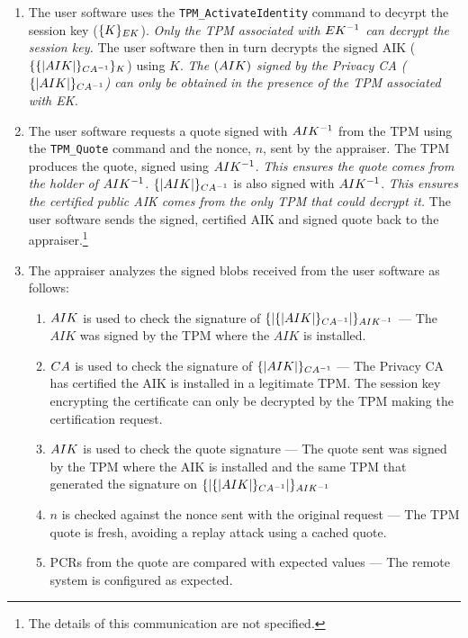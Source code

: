 \documentclass[10pt]{article}
\begin{document}
\begin{enumerate}
\item The user software uses the \verb+TPM_ActivateIdentity+ command
  to decyrpt the session key ($\{K\}_{EK}$).  \emph{Only the TPM
    associated with $EK^{-1}$ can decrypt the session key.}  The
  user software then in turn decrypts the signed AIK
  ($\{\{|AIK|\}_{CA^{-1}}\}_{K}$) using $K$.  \emph{The $(AIK)$
    signed by the Privacy CA ($\{|AIK|\}_{CA^{-1}}$) can only be
    obtained in the presence of the TPM associated with EK.}

\item The user software requests a quote signed with $AIK^{-1}$
  from the TPM using the \verb+TPM_Quote+ command and the nonce, $n$,
  sent by the appraiser.  The TPM produces the quote, signed using
  $AIK^{-1}$.  \emph{This ensures the quote comes from the holder
    of $AIK^{-1}$.}  $\{|AIK|\}_{CA^{-1}}$ is also signed
  with $AIK^{-1}$.  \emph{This ensures the certified public AIK
    comes from the only TPM that could decrypt it.}  The user software
  sends the signed, certified AIK and signed quote back to the
  appraiser.\footnote{The details of this communication are not
    specified.}

\item The appraiser analyzes the signed blobs received from the user
  software as follows: 
  
  \begin{enumerate}
  \item $AIK$ is used to check the signature of
    $\{|\{|AIK|\}_{CA^{-1}}|\}_{AIK^{-1}}$ --- The $AIK$ was signed by
    the TPM where the $AIK$ is installed.
    
  \item $CA$ is used to check the signature of
    $\{|AIK|\}_{CA^{-1}}$ --- The Privacy CA has certified the AIK
    is installed in a legitimate TPM.  The session key encrypting the
    certificate can only be decrypted by the TPM making the
    certification request.
  
  \item $AIK$ is used to check the quote signature --- The
    quote sent was signed by the TPM where the AIK is installed and
    the same TPM that generated the signature on
    $\{|\{|AIK|\}_{CA^{-1}}|\}_{AIK^{-1}}$
      
  \item $n$ is checked against the nonce sent with the original
    request --- The TPM quote is fresh, avoiding a replay attack using
    a cached quote.
    
  \item PCRs from the quote are compared with expected values --- The
    remote system is configured as expected.
  \end{enumerate}
\end{enumerate}
\end{document}
